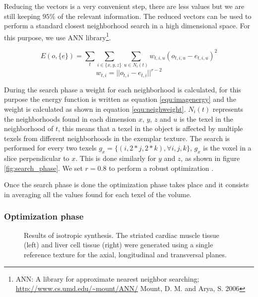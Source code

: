 Reducing the vectors is a very convenient step, there are less values but we are still keeping $95\%$ of the relevant information.
The reduced vectors can be used to perform a standard closest neighborhood search in a high dimensional space. 
For this purpose, we use ANN library\footnote{ANN: A library for approximate nearest neighbor searching; \url{http://www.cs.umd.edu/~mount/ANN/} Mount, D. M. and Arya, S. 2006}.

\begin{equation}
 E(o, \{e\} ) = \sum_{t} \sum_{i \in \{x, y, z\}} \sum_{u \in N_i(t)} w_{t, i, u} ( o_{t, i, u} - e_{t, i, u} )^2
 \label{equ:imagenergy} 
\end{equation}
\begin{equation}
 w_{t,i} = || o_{t, i} - e_{t, i} ||^{r - 2}
 \label{equ:neighweight}
\end{equation}

During the search phase a weight for each neighborhood is calculated, for this purpose the energy function 
is written as equation \ref{equ:imagenergy} and the weight is calculated
as shown in equation \ref{equ:neighweight}. $N_i(t)$ represents the neighborhoods found in each dimension $x$, $y$, $z$ 
and $u$ is the texel in the neighborhood of $t$, this means that
a texel in the object is affected by multiple texels from different neighborhoods in the exemplar texture. 
The search is performed for every two texels $g_x = \{(i, 2 * j, 2 * k), \forall i, j, k \} $, $g_x$ 
is the voxel in a slice perpendicular to $x$. This is done similarly for $y$ and $z$, as shown in figure \ref{fig:search_phase}.
We set $r = 0.8$ to perform a robust optimization \cite{kwatra:2005:SIGGRAPH}.

Once the search phase is done the optimization phase takes place and it consists in averaging 
all the values found for each texel of the volume. 

\subsubsection{Optimization phase}
\label{sec:OptimizationPhase}

\begin{figure} 
 \centering
 \caption{Results of isotropic synthesis. The striated cardiac muscle tissue (left)
          and liver cell tissue (right) were generated using a single reference texture 
          for the axial, longitudinal and transversal planes.
         }
 \label{fig:isotropicsynthesis} 
\end{figure}

